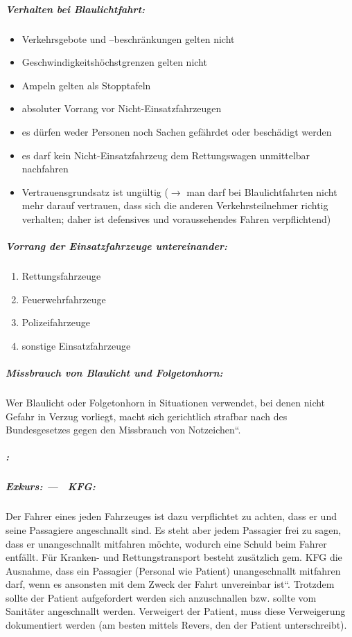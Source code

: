 \subparagraph*{Verhalten bei Blaulichtfahrt:}

\begin{itemize}
    \item Verkehrsgebote und --beschränkungen gelten nicht
    \item Geschwindigkeitsh\"ochstgrenzen gelten nicht
    \item Ampeln gelten als Stopptafeln
    \item absoluter Vorrang vor Nicht-Einsatzfahrzeugen
    \item es d\"urfen weder Personen noch Sachen gefährdet oder beschädigt
    werden
    \item es darf kein Nicht-Einsatzfahrzeug dem Rettungswagen unmittelbar
    nachfahren
    \item Vertrauensgrundsatz ist ung\"ultig (${\rightarrow}$ man darf bei
    Blaulichtfahrten nicht mehr darauf vertrauen, dass sich die anderen
    Verkehrsteilnehmer richtig verhalten; daher ist defensives
    und voraussehendes Fahren verpflichtend)
\end{itemize}

\subparagraph*{Vorrang der Einsatzfahrzeuge untereinander:}

\begin{enumerate}
    \item Rettungsfahrzeuge
    \item Feuerwehrfahrzeuge
    \item Polizeifahrzeuge
    \item sonstige Einsatzfahrzeuge
\end{enumerate}

\subparagraph*{Missbrauch von Blaulicht und Folgetonhorn:}

{\mdseries
Wer Blaulicht oder Folgetonhorn in Situationen verwendet, bei denen
nicht Gefahr in Verzug vorliegt, macht sich gerichtlich strafbar nach
 des {\quotedblbase}Bundesgesetzes gegen
den Missbrauch von Notzeichen{\textquotedblleft}.}

\subparagraph*{:}

\subparagraph*{Exkurs:  --- ~KFG:}

Der Fahrer eines jeden Fahrzeuges ist dazu verpflichtet zu achten, dass
er und seine Passagiere angeschnallt sind. Es steht aber jedem
Passagier frei zu sagen, dass er unangeschnallt mitfahren m\"ochte,
wodurch eine Schuld beim Fahrer entfällt. F\"ur Kranken- und
Rettungstransport besteht zusätzlich gem.  KFG die
Ausnahme, dass ein Passagier (Personal wie Patient) unangeschnallt mitfahren darf, wenn es ansonsten
{\quotedblbase}mit dem Zweck der Fahrt unvereinbar
ist{\textquotedblleft}. Trotzdem sollte der Patient aufgefordert werden
sich anzuschnallen bzw. sollte vom Sanitäter angeschnallt werden.
Verweigert der Patient, muss diese Verweigerung dokumentiert werden (am
besten mittels Revers, den der Patient unterschreibt).

